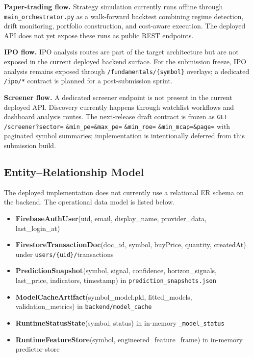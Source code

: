 \documentclass[12pt,a4paper]{report}
\numberwithin{equation}{chapter}
\begin{document}
\textbf{Paper-trading flow.} Strategy simulation currently runs offline through \texttt{main\_orchestrator.py} as a walk-forward backtest combining regime detection, drift monitoring, portfolio construction, and cost-aware execution. The deployed API does not yet expose these runs as public REST endpoints.

\textbf{IPO flow.} IPO analysis routes are part of the target architecture but are not exposed in the current deployed backend surface.
For the submission freeze, IPO analysis remains exposed through \texttt{/fundamentals/\{symbol\}} overlays; a dedicated \texttt{/ipo/*} contract is planned for a post-submission sprint.

\textbf{Screener flow.} A dedicated screener endpoint is not present in the current deployed API. Discovery currently happens through watchlist workflows and dashboard analysis routes.
The next-release draft contract is frozen as \texttt{GET /screener?sector=} \texttt{\&min\_pe=\&max\_pe=} \texttt{\&min\_roe=} \texttt{\&min\_mcap=\&page=} with paginated symbol summaries; implementation is intentionally deferred from this submission build.

\subsection{Entity--Relationship Model}

The deployed implementation does not currently use a relational ER schema on the backend. The operational data model is listed below.

\begin{itemize}
  \item \textbf{FirebaseAuthUser}(uid, email, display\_name, provider\_data, last\_login\_at)
  \item \textbf{FirestoreTransactionDoc}(doc\_id, symbol, buyPrice, quantity, createdAt) under \texttt{users/\{uid\}/}transactions
  \item \textbf{PredictionSnapshot}(symbol, signal, confidence, horizon\_signals, last\_price, indicators, timestamp) in \texttt{prediction\_snapshots.json}
  \item \textbf{ModelCacheArtifact}(symbol\_model.pkl, fitted\_models, validation\_metrics) in \texttt{backend/model\_cache}
  \item \textbf{RuntimeStatusState}(symbol, status) in in-memory \texttt{\_model\_status}
  \item \textbf{RuntimeFeatureStore}(symbol, engineered\_feature\_frame) in in-memory predictor store
\end{itemize}
\end{document}
